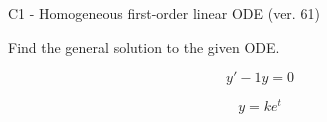 \begin{exercise}
  \begin{exerciseTitle}C1 - Homogeneous first-order linear ODE (ver. 61)\end{exerciseTitle}
  \begin{exerciseStatement}
    
Find the general solution to the given ODE.

    
\[y'-1y=0\]

  \end{exerciseStatement}
  \begin{exerciseAnswer}
    
\[y= k e^{t}\]

  \end{exerciseAnswer}
\end{exercise}
